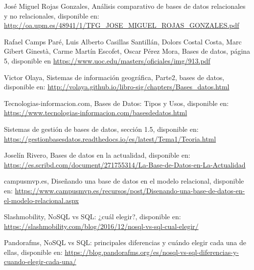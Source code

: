 
\begin{thebibliography}{99}

 José Miguel Rojas Gonzales, Análisis comparativo de bases de datos relacionales y no relacionales, disponible en: \url{http://oa.upm.es/48941/1/TFG_JOSE_MIGUEL_ROJAS_GONZALES.pdf}

 Rafael Camps Paré, Luis Alberto Casillas Santillán, Dolors Costal Costa, Marc Gibert Ginestà, Carme Martín Escofet, Oscar Pérez Mora, Bases de datos, página 5, disponible en \url{https://www.uoc.edu/masters/oficiales/img/913.pdf}

 Victor Olaya, Sistemas de información geográfica, Parte2, bases de datos, disponible en:  \url{http://volaya.github.io/libro-sig/chapters/Bases_datos.html}

 Tecnologias-informacion.com, Bases de Datos: Tipos y Usos, disponible en:  \url{https://www.tecnologias-informacion.com/basesdedatos.html}

 Sistemas de gestión de bases de datos, sección 1.5, disponible en: \url{https://gestionbasesdatos.readthedocs.io/es/latest/Tema1/Teoria.html}

 Joselín Rivero, Bases de datos en la actualidad, disponible en: \url{https://es.scribd.com/document/271755314/La-Base-de-Datos-en-La-Actualidad}

 campusmvp.es, Diseñando una base de datos en el modelo relacional, disponible en:  \url{https://www.campusmvp.es/recursos/post/Disenando-una-base-de-datos-en-el-modelo-relacional.aspx}

 Slashmobility, NoSQL vs SQL: ¿cuál elegir?, disponible en: \url{https://slashmobility.com/blog/2016/12/nosql-vs-sql-cual-elegir/}

 Pandorafms, NoSQL vs SQL: principales diferencias y cuándo elegir cada una de ellas, disponible en: \url{https://blog.pandorafms.org/es/nosql-vs-sql-diferencias-y-cuando-elegir-cada-una/}

\end{thebibliography}